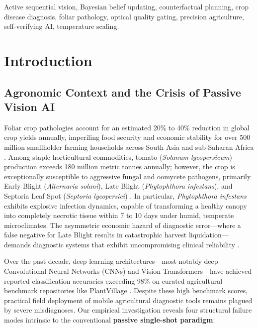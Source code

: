 \documentclass[conference]{IEEEtran}
\begin{document}
\begin{IEEEkeywords}
Active sequential vision, Bayesian belief updating, counterfactual planning, crop disease diagnosis, foliar pathology, optical quality gating, precision agriculture, self-verifying AI, temperature scaling.
\end{IEEEkeywords}

\section{Introduction}

\subsection{Agronomic Context and the Crisis of Passive Vision AI}
Foliar crop pathologies account for an estimated 20\% to 40\% reduction in global crop yields annually, imperiling food security and economic stability for over 500 million smallholder farming households across South Asia and sub-Saharan Africa \cite{hughes2015, mohanty2016}. Among staple horticultural commodities, tomato (\textit{Solanum lycopersicum}) production exceeds 180 million metric tonnes annually; however, the crop is exceptionally susceptible to aggressive fungal and oomycete pathogens, primarily Early Blight (\textit{Alternaria solani}), Late Blight (\textit{Phytophthora infestans}), and Septoria Leaf Spot (\textit{Septoria lycopersici}) \cite{agrios2005}. In particular, \textit{Phytophthora infestans} exhibits explosive infection dynamics, capable of transforming a healthy canopy into completely necrotic tissue within 7 to 10 days under humid, temperate microclimates. The asymmetric economic hazard of diagnostic error---where a false negative for Late Blight results in catastrophic harvest liquidation---demands diagnostic systems that exhibit uncompromising clinical reliability \cite{ferentinos2018}.

Over the past decade, deep learning architectures---most notably deep Convolutional Neural Networks (CNNs) and Vision Transformers---have achieved reported classification accuracies exceeding 98\% on curated agricultural benchmark repositories like PlantVillage \cite{hughes2015, mohanty2016}. Despite these high benchmark scores, practical field deployment of mobile agricultural diagnostic tools remains plagued by severe misdiagnoses. Our empirical investigation reveals four structural failure modes intrinsic to the conventional \textbf{passive single-shot paradigm}:
\end{document}
